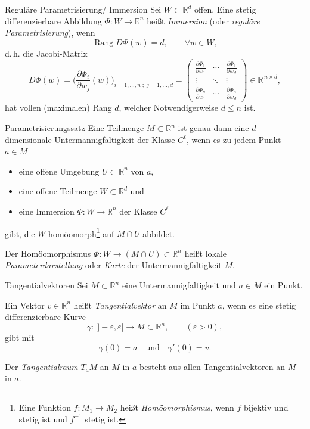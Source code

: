 \begin{definition}{Reguläre Parametrisierung/ Immersion}
    Sei $W\subset\mathbb{R}^d$ offen.
    Eine stetig differenzierbare Abbildung $\Phi: W \to \mathbb{R}^n$ heißt \emph{Immersion} (oder \emph{reguläre Parametrisierung}), wenn
    $$
    \operatorname{Rang}D\Phi(w)=d,\qquad \forall w\in W,
    $$
    d.\,h. die Jacobi-Matrix
    $$
    D\Phi(w)=\Bigg(\frac{\partial\Phi_i}{\partial w_j}(w)\Bigg)_{i=1,\dots,n\;;\;j=1,\dots,d}
    =
    \begin{pmatrix}
    \frac{\partial\Phi_1}{\partial w_1} & \cdots & \frac{\partial\Phi_1}{\partial w_d} \\
    \vdots & \ddots & \vdots \\
    \frac{\partial\Phi_n}{\partial w_1} & \cdots & \frac{\partial\Phi_n}{\partial w_d}
    \end{pmatrix}
    \in\mathbb{R}^{\,n\times d},
    $$
    hat vollen (maximalen) Rang $d$, welcher Notwendigerweise $d \leq n$ ist.   
\end{definition}

\begin{satz}{Parametrisierungssatz}
    Eine Teilmenge $M\subset\mathbb{R}^n$ ist genau dann eine $d$-dimensionale Untermannigfaltigkeit der Klasse $C^\ell$, wenn es zu jedem Punkt $a\in M$
    \begin{itemize}
    \item eine offene Umgebung $U\subset\mathbb{R}^n$ von $a$,
    \item eine offene Teilmenge $W\subset\mathbb{R}^d$ und
    \item eine Immersion $\Phi:W\to\mathbb{R}^n$ der Klasse $C^\ell$
    \end{itemize}
    gibt, die $W$ homöomorph\footnote{Eine Funktion $f:M_1\to M_2$ heißt \emph{Homöomorphismus}, wenn $f$ bijektiv und stetig ist und $f^{-1}$ stetig ist.} auf $M\cap U$ abbildet.

    Der Homöomorphismus $\Phi:W\to (M\cap U)\subset\mathbb{R}^n$ heißt lokale \emph{Parameterdarstellung} oder \emph{Karte} der Untermannigfaltigkeit $M$.    
\end{satz}

\begin{definition}{Tangentialvektoren}
    Sei $M\subset\mathbb{R}^n$ eine Untermannigfaltigkeit und $a\in M$ ein Punkt.
    \vspace{1em}

    Ein Vektor $v\in\mathbb{R}^n$ heißt \emph{Tangentialvektor} an $M$ im Punkt $a$, wenn es eine stetig differenzierbare Kurve
    $$
    \gamma\colon\; ]-\varepsilon,\varepsilon[ \to M\subset\mathbb{R}^n,\qquad (\varepsilon>0),
    $$
    gibt mit
    $$
    \gamma(0)=a \quad\text{und}\quad \gamma'(0)=v.
    $$

    Der \emph{Tangentialraum} $T_aM$ an $M$ in $a$ besteht aus allen Tangentialvektoren an $M$ in $a$.  
\end{definition}

